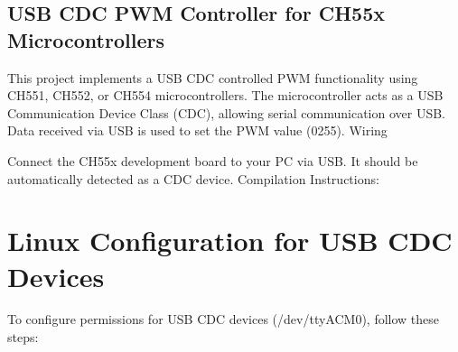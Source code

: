 \documentclass[letterpaper,10pt,english]{sphinxmanual}
\begin{document}
\subsection{USB CDC PWM Controller for CH55x Microcontrollers}
\label{\detokenize{cdc:usb-cdc-pwm-controller-for-ch55x-microcontrollers}}
\sphinxAtStartPar
This project implements a USB CDC controlled PWM functionality using CH551, CH552, or CH554 microcontrollers. The microcontroller acts as a USB Communication Device Class (CDC), allowing serial communication over USB. Data received via USB is used to set the PWM value (0\sphinxhyphen{}255).
Wiring

\sphinxAtStartPar
Connect the CH55x development board to your PC via USB. It should be automatically detected as a CDC device.
Compilation Instructions:

\begin{sphinxVerbatim}[commandchars=\\\{\}]
    
   
      
        
                  
        
           
\end{sphinxVerbatim}


\section{Linux Configuration for USB CDC Devices}
\label{\detokenize{cdc:linux-configuration-for-usb-cdc-devices}}
\sphinxAtStartPar
To configure permissions for USB CDC devices (/dev/ttyACM0), follow these steps:
\end{document}

